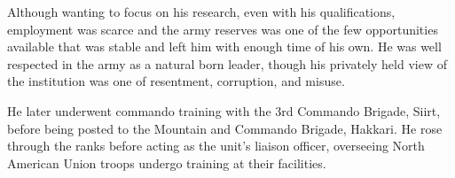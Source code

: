 Although wanting to focus on his research, even with his qualifications, employment was scarce and the army reserves was one of the few opportunities available that was stable and left him with enough time of his own. He was well respected in the army as a natural born leader, though his privately held view of the institution was one of resentment, corruption, and misuse.

He later underwent commando training with the 3rd Commando Brigade, Siirt, before being posted to the Mountain and Commando Brigade, Hakkari. He rose through the ranks before acting as the unit's liaison officer, overseeing North American Union troops undergo training at their facilities.

